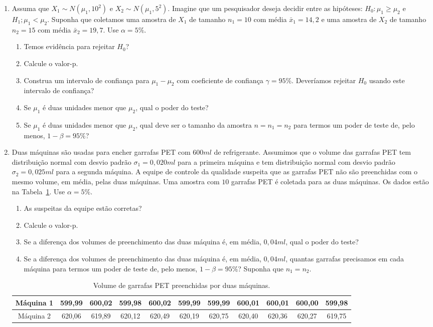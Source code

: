 \documentclass[8pt, a4paper]{article}
\begin{document}
\begin{enumerate}
	\item Assuma que $X_1 \sim N(\mu_1, 10^2)$ e $X_2 \sim N(\mu_1, 5^2)$. Imagine que um pesquisador deseja decidir entre as hipóteses: $H_0: \mu_1 \geq \mu_2$  e $H_1; \mu_1 < \mu_2$. Suponha que coletamos uma amostra de $X_1$ de tamanho $n_1=10$ com média $\bar{x}_1=14,2$ e uma amostra de $X_2$ de tamanho $n_2=15$ com média $\bar{x}_2=19,7$. Use $\alpha=5\%$.
	\begin{enumerate}
		\item Temos evidência para rejeitar $H_0$?
		\item Calcule o valor-p. 
		\item Construa um intervalo de confiança para $\mu_1 - \mu_2$ com coeficiente de confiança $\gamma=95\%$. Deveríamos rejeitar $H_0$ usando este intervalo de confiança?
		\item Se $\mu_1$ é duas  unidades menor que $\mu_2$, qual o poder do teste?
		\item Se $\mu_1$ é duas unidades menor que $\mu_2$, qual deve ser o tamanho da amostra $n=n_1=n_2$ para termos um poder de teste de, pelo menos, $1-\beta = 95\%$?
	\end{enumerate}

	\item Duas máquinas são usadas para encher garrafas PET com $600ml$ de refrigerante. Assumimos que o volume das garrafas PET tem distribuição normal com desvio padrão $\sigma_1 = 0,020ml$ para a primeira máquina e tem distribuição normal com desvio padrão $\sigma_2 = 0,025ml$ para a segunda máquina. A equipe de controle da qualidade suspeita que as garrafas PET não são preenchidas com o mesmo volume, em média, pelas duas máquinas. Uma amostra com $10$ garrafas PET é coletada para as duas máquinas. Os dados estão na Tabela~\ref{tab:volume-pet}. Use $\alpha = 5\%$.
	\begin{enumerate}
		\item As suspeitas da equipe estão corretas?
		\item Calcule o valor-p.
		\item Se a diferença dos volumes de preenchimento das duas máquina é, em média, $0,04 ml$, qual o poder do teste?
		\item Se a diferença dos volumes de preenchimento das duas máquina é, em média, $0,04ml$, quantas garrafas precisamos em cada máquina para termos um poder de teste de, pelo menos, $1-\beta = 95\%$? Suponha que $n_1=n_2$.
	\end{enumerate}
	\begin{table}[ht]
		\centering
		\begin{tabular}{c|cccccccccc}
			\toprule[0.05cm]
			Máquina 1 & 599,99 & 600,02 & 599,98 & 600,02 & 599,99 & 599,99 & 600,01 & 600,01 & 600,00 & 599,98 \\ \midrule[0.025cm]
			Máquina 2 & 620,06 & 619,89 & 620,12 & 620,49 & 620,19 & 620,75 & 620,40 & 620,36 & 620,27 & 619,75 \\ 
			\bottomrule[0.05cm]
		\end{tabular}
		\caption{Volume de garrafas PET preenchidas por duas máquinas.} 
		\label{tab:volume-pet}
	\end{table}


\end{enumerate}
\end{document}
